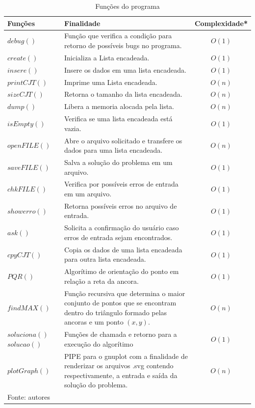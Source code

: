 \documentclass[12pt,a4paper]{article}
\begin{document}
\begin{table}[!htbp]
	\centering
	\caption{Funções do programa}
	\renewcommand{\arraystretch}{1.5}
	\begin{tabular}{L{3cm} L{10cm} c}
		\toprule 
		Funções & Finalidade & Complexidade* \\ 
		\midrule
		$debug()$ & Função que verifica a condição para retorno de possíveis bugs no programa. & $O(1)$ \\
		$create()$ & Inicializa a Lista encadeada. & $O(1)$ \\
		$insere()$ & Insere os dados em uma lista encadeada. & $O(1)$ \\
		$printCJT()$ & Imprime uma Lista encadeada. & $O(n)$ \\
		$sizeCJT()$ & Retorna o tamanho da lista encadeada. & $O(n)$ \\
		$dump()$ & Libera a memoria alocada pela lista. & $O(n)$ \\
		$isEmpty()$ & Verifica se uma lista encadeada está vazia. & $O(1)$ \\
		$openFILE()$ & Abre o arquivo solicitado e transfere os dados para uma lista encadeada. & $O(n)$ \\
		$saveFILE()$ & Salva a solução do problema em um arquivo. & $O(1)$ \\
		$chkFILE()$ & Verifica por possíveis erros de entrada em um arquivo. & $O(1)$ \\
		$showerro()$ & Retorna possíveis erros no arquivo de entrada. & $O(1)$ \\
		$ask()$ & Solicita a confirmação do usuário caso erros de entrada sejam encontrados. & $O(1)$ \\
		$cpyCJT()$ & Copia os dados de uma lista encadeada para outra lista encadeada. & $O(1)$ \\
		$PQR()$ & Algorítimo de orientação do ponto em relação a reta da ancora. & $O(1)$ \\
		$findMAX()$ & Função recursiva que determina o maior conjunto de pontos que se encontram dentro do triângulo formado pelas ancoras e um ponto $(x,y)$.  & $O(n)$ \\
		$soluciona()$ \newline $solucao()$ & Funções de chamada e retorno para a execução do algorítimo & $O(1)$ \\
		$plotGraph()$ & PIPE para o gnuplot com a finalidade de renderizar os arquivos .svg contendo respectivamente, a entrada e saída da solução do problema.  & $O(n)$ \\ 
		\bottomrule
		\footnotesize Fonte: autores
	\end{tabular}
\end{table}
\end{document}
